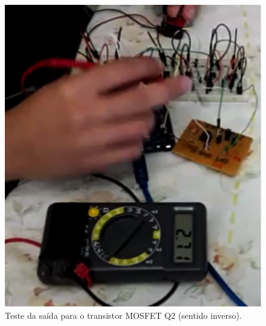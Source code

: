 \begin{anexosenv}
      \begin{figure}
          \begin{center}
              \includegraphics{figuras/teste_alimentacao_5.png}
          \end{center}
          \caption{Teste da saída para o transistor MOSFET Q2 (sentido inverso).}
          \label{fig:teste_alimentacao_5.png}
      \end{figure}

\end{anexosenv}
